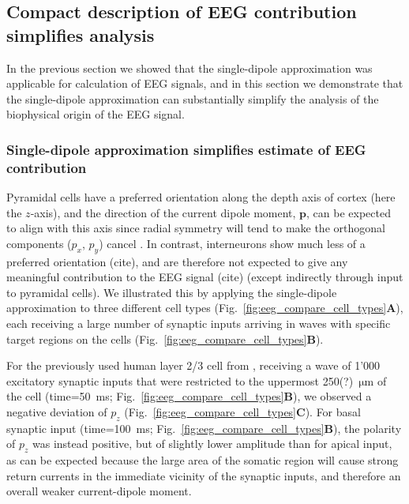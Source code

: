 \documentclass[preprint,10pt,authoryear]{elsarticle}
\begin{document}
\subsection{Compact description of EEG contribution simplifies analysis}\label{subsec:compact}
In the previous section we showed that the single-dipole approximation was applicable for calculation of EEG signals, and in this section we demonstrate that the single-dipole approximation can substantially simplify the analysis of the biophysical origin of the EEG signal.

\subsubsection{Single-dipole approximation simplifies estimate of EEG contribution}

Pyramidal cells have a preferred orientation along the depth axis of cortex (here the $z$-axis), and the direction of the current dipole moment, $\mathbf{p}$, can be expected to align with this axis since
radial symmetry will tend to make the orthogonal components ($p_x$, $p_y$) cancel \citep{HAGEN2018}. 
In contrast, interneurons show much less of a preferred orientation
(cite), and are therefore not expected to give any meaningful contribution to the EEG signal (cite) (except indirectly through input to pyramidal cells).
We illustrated this by applying the single-dipole approximation to three different cell types (Fig.~\ref{fig:eeg_compare_cell_types}\textbf{A}), each receiving a large number of synaptic inputs arriving in waves with specific target regions on the cells (Fig.~\ref{fig:eeg_compare_cell_types}\textbf{B}).

For the previously used human layer 2/3 cell from \cite{EYAL2016},
receiving a wave of 1'000 excitatory synaptic inputs that were restricted to the uppermost 250(?)~$\si{\um}$ of the cell (time=50~ms; Fig.~\ref{fig:eeg_compare_cell_types}\textbf{B}), we observed a negative deviation of $p_z$ (Fig.~\ref{fig:eeg_compare_cell_types}\textbf{C}). For basal synaptic input (time=100~ms; Fig.~\ref{fig:eeg_compare_cell_types}\textbf{B}), the polarity of $p_z$ was instead positive, but of slightly lower amplitude than for apical input, as can be expected because the large area of the somatic region will cause strong return currents in the immediate vicinity of the synaptic inputs, and therefore an overall weaker current-dipole moment.
\end{document}
